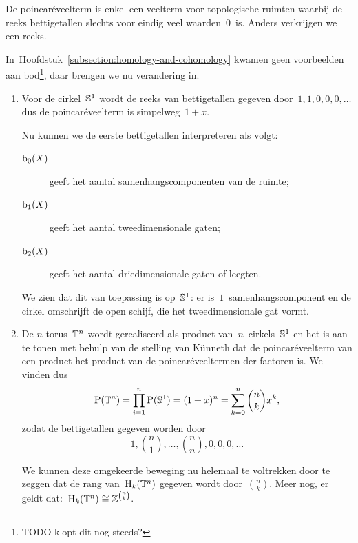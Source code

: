 \documentclass[a4paper,11pt,openany,oneside,article]{memoir}
\begin{document}
\begin{remark}
  De poincar\'eveelterm is enkel een veelterm voor topologische ruimten waarbij de reeks bettigetallen slechts voor eindig veel waarden~$0$~is. Anders verkrijgen we een reeks.
\end{remark}

In~Hoofdstuk~\ref{subsection:homology-and-cohomology} kwamen geen voorbeelden aan bod\footnote{TODO klopt dit nog steeds?}, daar brengen we nu verandering in.
\begin{example} \hfil
  \label{example:betti-numbers}
  \begin{enumerate}
    \item Voor de cirkel~$\mathbb{S}^1$ wordt de reeks van bettigetallen gegeven door~$1,1,0,0,0,\ldots$ dus de poincar\'eveelterm is simpelweg~$1+x$.
      
      Nu kunnen we de eerste bettigetallen interpreteren als volgt:
      \begin{description}
        \item[$\mathrm{b}_0(X)$] geeft het aantal samenhangscomponenten van de ruimte;
        \item[$\mathrm{b}_1(X)$] geeft het aantal tweedimensionale gaten;
        \item[$\mathrm{b}_2(X)$] geeft het aantal driedimensionale gaten of leegten.
      \end{description}

      We zien dat dit van toepassing is op~$\mathbb{S}^1$: er is~$1$~samenhangscomponent en de cirkel omschrijft de open schijf, die het tweedimensionale gat vormt.

    \item De $n$\nobreakdash-torus~$\mathbb{T}^n$ wordt gerealiseerd als product van~$n$~cirkels~$\mathbb{S}^1$ en het is aan te tonen met behulp van de stelling van K\"unneth dat de poincar\'eveelterm van een product het product van de poincar\'eveeltermen der factoren is. We vinden dus
      \begin{equation}
        \mathrm{P}(\mathbb{T}^n)=\prod_{i=1}^n\mathrm{P}(\mathbb{S}^1)=(1+x)^n=\sum_{k=0}^n\binom{n}{k}x^k,
      \end{equation}
      zodat de bettigetallen gegeven worden door
      \begin{equation}
        1,\binom{n}{1},\ldots,\binom{n}{n},0,0,0,\ldots
      \end{equation}

      We kunnen deze omgekeerde beweging nu helemaal te voltrekken door te zeggen dat de rang van~$\mathrm{H}_k(\mathbb{T}^n)$ gegeven wordt door~$\binom{n}{k}$. Meer nog, er geldt dat:~$\mathrm{H}_k(\mathbb{T}^n)\cong\mathbb{Z}^{\binom{n}{k}}$.


\end{enumerate}
\end{example}
\end{document}
